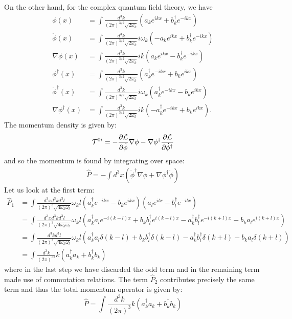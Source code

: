 \documentclass{../mathnotes}
\begin{document}
On the other hand, for the complex quantum field theory, we have
\begin{align*}
    \phi(x)&=\int \frac{d^3k}{(2\pi)^{3/2}\sqrt{2\omega_k}}\left( a_ke^{ikx}+b_k^\dagger e^{-ikx} \right)\\
    \dot\phi(x)&=\int \frac{d^3k}{(2\pi)^{3/2}\sqrt{2\omega_k}}i\omega_k\left( -a_ke^{ikx}+b_k^\dagger e^{-ikx} \right)\\
    \nabla\phi(x)&=\int \frac{d^3k}{(2\pi)^{3/2}\sqrt{2\omega_k}}ik\left( a_ke^{ikx}-b_k^\dagger e^{-ikx} \right)\\
    \phi^\dagger(x)&=\int \frac{d^3k}{(2\pi)^{3/2}\sqrt{2\omega_k}}\left( a_k^\dagger e^{-ikx}+b_k e^{ikx} \right)\\
    \dot\phi^\dagger(x)&=\int \frac{d^3k}{(2\pi)^{3/2}\sqrt{2\omega_k}}i\omega_k\left( a_k^\dagger e^{-ikx}-b_ke^{ikx} \right)\\
    \nabla\phi^\dagger(x)&=\int \frac{d^3k}{(2\pi)^{3/2}\sqrt{2\omega_k}}ik\left(-a_k^\dagger e^{-ikx}+b_ke^{ikx} \right).
\end{align*}
The momentum density is given by:
\begin{align*}
    \mathcal{T}^{0i}=-\frac{\partial\mathcal{L}}{\partial\dot\phi}\nabla\phi-\nabla\phi^\dagger\frac{\partial\mathcal{L}}{\partial\dot\phi^\dagger}
\end{align*}
and so the momentum is found by integrating over space:
\begin{align*}
    \hat P=-\int d^3x \left( \dot\phi^\dagger\nabla\phi+\nabla\phi^\dagger\dot\phi \right)
\end{align*}
Let us look at the first term:
\begin{align*}
    \hat P_1&=\int \frac{d^3xd^3kd^3l}{(2\pi)^3\sqrt{4\omega_k\omega_l}}\omega_kl\left( a_k^\dagger e^{-ikx}-b_ke^{ikx} \right)
    \left( a_le^{ilx}-b_l^\dagger e^{-ilx} \right)\\
    &=\int \frac{d^3xd^3kd^3l}{(2\pi)^3\sqrt{4\omega_k\omega_l}}\omega_kl\left( a_k^\dagger a_le^{-i(k-l)x}+b_kb_l^\dagger e^{i(k-l)x}
    -a_k^\dagger b_l^\dagger e^{-i(k+l)x}-b_ka_l e^{i(k+l)x}\right)\\
    &=\int \frac{d^3kd^3l}{(2\pi)^3\sqrt{4\omega_k\omega_l}}\omega_kl\left( a_k^\dagger a_l\delta(k-l)+b_kb_l^\dagger \delta(k-l)
    -a_k^\dagger b_l^\dagger \delta(k+l)-b_ka_l \delta(k+l)\right)\\
    &=\int\frac{d^3k}{(2\pi)^32} k\left(a_k^\dagger a_k+b_k^\dagger b_k\right)
\end{align*}
where in the last step we have discarded the odd term and in the remaining term made use of commutation relations. The
term $\hat P_2$ contributes precisely the same term and thus the total momentum operator is given by:
\[\hat P=\int\frac{d^3k}{(2\pi)^3} k\left(a_k^\dagger a_k+b_k^\dagger b_k\right)\]
\end{document}
